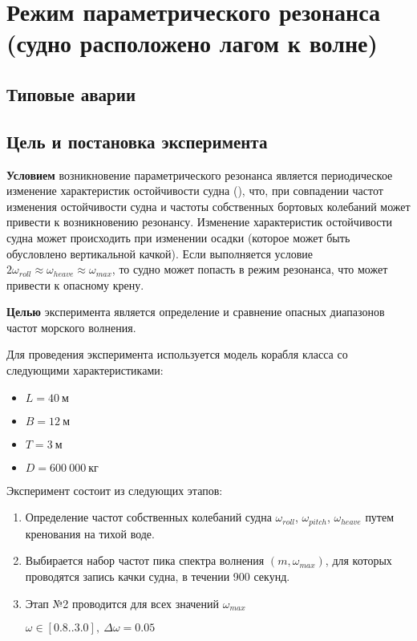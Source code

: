 \section{Режим параметрического резонанса (судно расположено лагом к волне)}

\subsection{Типовые аварии}


\subsection{Цель и постановка эксперимента}

\textbf{Условием} возникновение параметрического резонанса является периодическое изменение характеристик остойчивости судна (), что, при совпадении частот изменения остойчивости судна и частоты собственных бортовых колебаний может привести к возникновению резонансу.
Изменение характеристик остойчивости судна может происходить при изменении осадки (которое может быть обусловлено вертикальной качкой). Если выполняется условие
$2 \omega_{roll} \approx \omega_{heave} \approx \omega_{max}$, то судно может попасть в режим резонанса, что может привести к опасному крену.

\textbf{Целью} эксперимента является определение и сравнение опасных диапазонов частот морского волнения.

Для проведения эксперимента используется модель корабля класса  со следующими характеристиками:
\begin{itemize}
	\item	$L = 40\ \text{м}$
	\item	$B = 12\ \text{м}$
	\item	$T = 3\ \text{м}$
	\item	$D = 600\ 000\ \text{кг}$
\end{itemize}

Эксперимент состоит из следующих этапов:
\begin{enumerate}
	\item	Определение частот собственных колебаний судна 
			$\omega_{roll}$, $\omega_{pitch}$, $\omega_{heave}$ путем кренования на тихой воде.
	\item	Выбирается набор частот пика спектра волнения $(m, \omega_{max})$, для которых
			проводятся запись качки судна, в течении 900 секунд.
	\item	Этап №2	проводится для всех значений $\omega_{max}$
			
			$\omega \in [0.8..3.0],\ \Delta\omega=0.05$ 

\end{enumerate}


